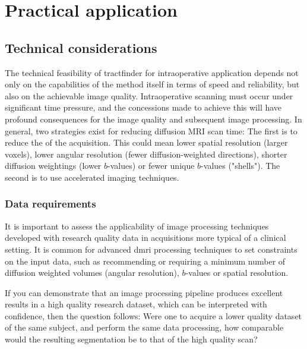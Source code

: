 \chapter{Practical application}
\label{chap:applications}



\section{Technical considerations}

The technical feasibility of tractfinder for intraoperative application depends not only on the capabilities of the method itself in terms of speed and reliability, but also on the achievable image quality.
Intraoperative scanning must occur under significant time pressure, and the concessions made to achieve this will have profound consequences for the image quality and subsequent image processing.
In general, two strategies exist for reducing diffusion MRI scan time:
The first is to reduce the  of the acquisition.
This could mean lower spatial resolution (larger voxels), lower angular resolution (fewer diffusion-weighted directions), shorter diffusion weightings (lower $b$-values) or fewer unique $b$-values ("shells").
The second is to use accelerated imaging techniques.

\subsection{Data requirements}\label{sec:ismrmdiff}

It is important to assess the applicability of image processing techniques developed with research quality data in acquisitions more typical of a clinical setting.
It is common for advanced \gls{dmri} processing techniques to set constraints on the input data, such as recommending or requiring a minimum number of diffusion weighted volumes (angular resolution), $b$-values or spatial resolution.

If you can demonstrate that an image processing pipeline produces excellent results in a high quality research dataset, which can be interpreted with confidence, then the question follows:
Were one to acquire a lower quality dataset of the same subject, and perform the same data processing, how comparable would the resulting segmentation be to that of the high quality scan?


